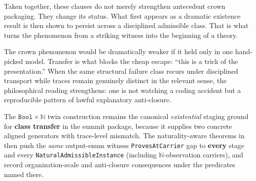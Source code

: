 \documentclass[11pt,a4paper]{article}
\theoremstyle{definition}
\begin{document}
Taken together, these clauses do not merely strengthen antecedent crown packaging. They change its status. What first appears as a dramatic existence result is then shown to persist across a disciplined admissible class. That is what turns the phenomenon from a striking witness into the beginning of a theory.

The crown phenomenon would be dramatically weaker if it held only in one hand-picked model. Transfer is what blocks the cheap escape: ``this is a trick of the presentation.'' When the same structural failure class recurs under disciplined transport while traces remain genuinely distinct in the relevant sense, the philosophical reading strengthens: one is not watching a coding accident but a reproducible pattern of lawful explanatory anti-closure.

\medskip
\noindent
The $\texttt{Bool}{\times}\mathbb{N}$ twin construction remains the canonical \emph{existential} staging ground for \textbf{class transfer} in the summit package, because it supplies two concrete aligned generators with trace-level mismatch. The naturality-aware theorems in  then push the \emph{same} output-enum witness \texttt{ProvesAtCarrier} gap to \textbf{every} stage and every \texttt{NaturalAdmissibleInstance} (including $\mathbb{N}$-observation carriers), and record organization-scale and anti-closure consequences under the predicates named there.
\end{document}
